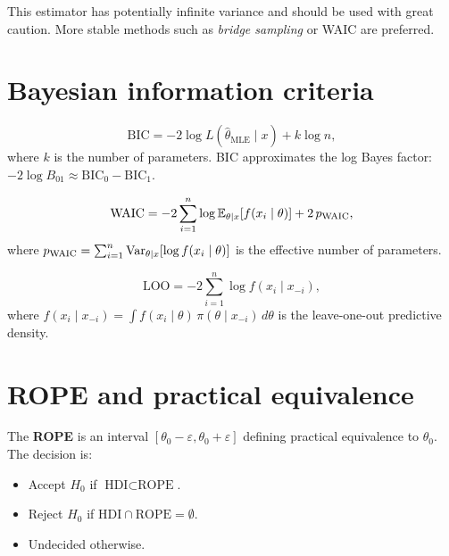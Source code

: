 \begin{warning}[title=\textbf{Instability of the harmonic mean}]
This estimator has potentially infinite variance and should be used
with great caution. More stable methods such as \textit{bridge sampling}
or WAIC are preferred.
\end{warning}

\section{Bayesian information criteria}

\begin{definition}
\[
  \text{BIC} = -2\log L(\hat{\theta}_{\text{MLE}} \mid x) + k\log n,
\]
where $k$ is the number of parameters. BIC approximates the log Bayes
factor: $-2\log B_{01} \approx \text{BIC}_0 - \text{BIC}_1$.
\end{definition}

\begin{definition}
\[
  \text{WAIC} = -2\sum_{i=1}^n \log \mathbb{E}_{\theta \mid x}[f(x_i \mid \theta)]
  + 2\,p_{\text{WAIC}},
\]
where $p_{\text{WAIC}} = \sum_{i=1}^n \mathrm{Var}_{\theta \mid x}[\log f(x_i \mid \theta)]$
is the effective number of parameters.
\end{definition}

\begin{definition}
\[
  \text{LOO} = -2\sum_{i=1}^n \log f(x_i \mid x_{-i}),
\]
where $f(x_i \mid x_{-i}) = \int f(x_i \mid \theta)\,\pi(\theta \mid x_{-i})\,d\theta$
is the leave-one-out predictive density.
\end{definition}

\section{ROPE and practical equivalence}

\begin{definition}
The \textbf{ROPE} is an interval
$[\theta_0 - \varepsilon, \theta_0 + \varepsilon]$ defining practical
equivalence to $\theta_0$. The decision is:
\begin{itemize}
  \item Accept $H_0$ if $\text{HDI} \subset \text{ROPE}$.
  \item Reject $H_0$ if $\text{HDI} \cap \text{ROPE} = \emptyset$.
  \item Undecided otherwise.
\end{itemize}
\end{definition}

